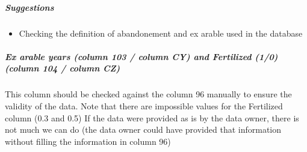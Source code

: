 \documentclass[table]{article}
\providecommand{\tightlist}{%
  \setlength{\itemsep}{0pt}\setlength{\parskip}{0pt}}
\let\oldsubparagraph\subparagraph
\renewcommand{\subparagraph}[1]{\oldsubparagraph{#1}\mbox{}}
\begin{document}
\subparagraph{\texorpdfstring{\emph{Suggestions}}{Suggestions}}\label{suggestions-7}

\begin{itemize}
\tightlist
\item
  Checking the definition of abandonement and ex arable used in the
  database
\end{itemize}

\subparagraph{Ex arable years (column 103 / column CY) and Fertilized
(1/0) (column 104 / column
CZ)}\label{ex-arable-years-column-103-column-cy-and-fertilized-10-column-104-column-cz}

This column should be checked against the column 96 manually to ensure
the validity of the data. Note that there are impossible values for the
Fertilized column (0.3 and 0.5) If the data were provided as is by the
data owner, there is not much we can do (the data owner could have
provided that information without filling the information in column 96)
\end{document}
